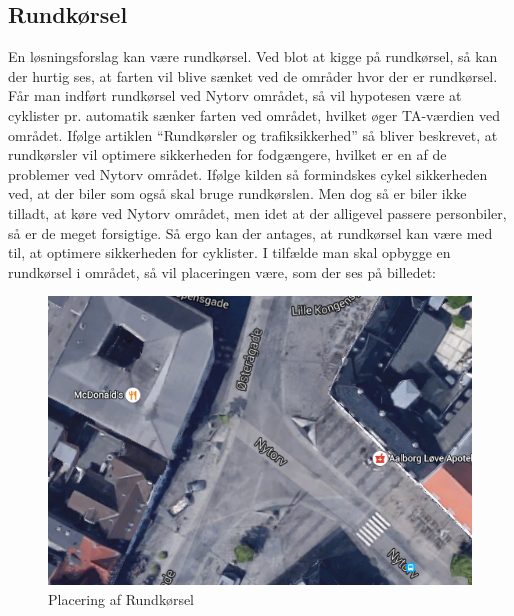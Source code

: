 \subsection{Rundkørsel}
\label{sub:rundkoersel}
En løsningsforslag kan være rundkørsel. Ved blot at kigge på rundkørsel, så kan der hurtig ses, at farten vil blive sænket ved de områder hvor der er rundkørsel. Får man indført rundkørsel ved Nytorv området, så vil hypotesen være at cyklister pr. automatik sænker farten ved området, hvilket øger TA-værdien ved området.  Ifølge artiklen “Rundkørsler og trafiksikkerhed” så bliver beskrevet, at rundkørsler vil optimere sikkerheden for fodgængere, hvilket er en af de problemer ved Nytorv området. Ifølge kilden så formindskes cykel sikkerheden ved, at der biler som også skal bruge rundkørslen. Men dog så er biler ikke tilladt, at køre ved Nytorv området, men idet at der alligevel passere personbiler, så er de meget forsigtige. Så ergo kan der antages, at rundkørsel kan være med til, at optimere sikkerheden for cyklister. I tilfælde man skal opbygge en rundkørsel i området, så vil placeringen være, som der ses på billedet:

 \begin{figure}[htbp]
   \centering
   \begin{adjustbox}{max width=\textwidth}
     \includegraphics{figures/Billederogfigur/rundkorselplace.png} %
  \end{adjustbox}
   \caption{Placering af Rundkørsel}
    \label{fig:rundkorselplace}
 \end{figure}
 \newpage

